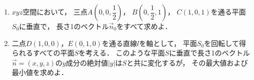 \documentclass[../../main.tex]{subfiles}
\begin{document}
\begin{enumerate}
  \item $xyz$空間において，
    三点$\displaystyle A \left( 0,0,\dfrac{1}{2} \right)$，
    $\displaystyle B \left( 0,\dfrac{1}{2},1 \right)$，
    $C(1,0,1)$を通る平面$S_0$に垂直で，
    長さ1のベクトル$\vec{n}_0$をすべて求めよ．
  \item 二点$D(1,0,0)$，$E(0,1,0)$を通る直線$l$を軸として，
    平面$S_0$を回転して得られるすべての平面$S$を考える．
    このような平面$S$に垂直で長さ1のベクトル$\vec{n}=(x,y,z)$の$y$成分の絶対値$|y|$は$S$と共に変化するが，
    その最大値および最小値を求めよ．
\end{enumerate}
\end{document}

